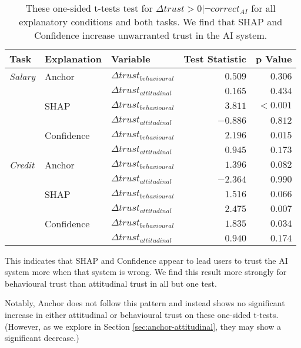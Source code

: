 \begin{table}[htb]
    \centering
    \caption{These one-sided t-tests test for $\Delta trust > 0 | \neg correct_{AI}$ for all explanatory conditions and both tasks. We find that SHAP and Confidence increase unwarranted trust in the AI system.}
    \label{tab:delta-trust-t}
    \begin{tabular}{l l l r r}
        \toprule
        Task & Explanation & Variable & Test Statistic & p Value \\ 
        \midrule
        \emph{Salary} & Anchor & $\Delta trust_{behavioural}$ & $0.509$ & $0.306$ \\
        & & $\Delta trust_{attitudinal}$ & $0.165$ & $0.434$ \\
        & SHAP & $\Delta trust_{behavioural}$ & $\mathbf{3.811}$ & $\mathbf{<0.001}$ \\
        & & $\Delta trust_{attitudinal}$ & $-0.886$ & $0.812$ \\
        & Confidence & $\Delta trust_{behavioural}$ & $\mathbf{2.196}$ & $\mathbf{0.015}$ \\
        & & $\Delta trust_{attitudinal}$ & $0.945$ & $0.173$ \\
        \midrule
        \emph{Credit} & Anchor & $\Delta trust_{behavioural}$ & $1.396$ & $0.082$ \\
        & & $\Delta trust_{attitudinal}$ & $-2.364$ & $0.990$ \\
        & SHAP & $\Delta trust_{behavioural}$ & $1.516$ & $0.066$ \\
        & & $\Delta trust_{attitudinal}$ & $\mathbf{2.475}$ & $\mathbf{0.007}$ \\
        & Confidence & $\Delta trust_{behavioural}$ & $\mathbf{1.835}$ & $\mathbf{0.034}$ \\
        & & $\Delta trust_{attitudinal}$ & $0.940$ & $0.174$ \\
        \bottomrule
    \end{tabular}
\end{table}

This indicates that SHAP and Confidence appear to lead users to trust the AI system more when that system is wrong. We find this result more strongly for behavioural trust than attitudinal trust in all but one test.

Notably, Anchor does not follow this pattern and instead shows no significant increase in either attitudinal or behavioural trust on these one-sided t-tests. (However, as we explore in Section \ref{sec:anchor-attitudinal}, they may show a significant decrease.)

